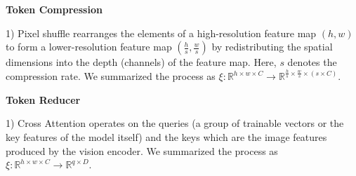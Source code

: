 \noindent \textbf{Token Compression}

1) Pixel shuffle \cite{chen2024far} rearranges the elements of a high-resolution feature map $(h, w)$ to form a lower-resolution feature map $(\frac{h}{s}, \frac{w}{s})$ by redistributing the spatial dimensions into the depth (channels) of the feature map. Here, $s$ denotes the compression rate. 
We summarized the process as $\xi: \mathbb{R}^{h \times w \times C} \xrightarrow{} \mathbb{R}^{\frac{h}{s} \times \frac{w}{s} \times (s\times C)}$.


\noindent \textbf{Token Reducer} 

1) Cross Attention \cite{alayrac2022flamingovisuallanguagemodel,li2023blip2bootstrappinglanguageimagepretraining,chen2024internvlscalingvisionfoundation,dai2023instructblipgeneralpurposevisionlanguagemodels} operates on the queries (a group of trainable vectors or the key features of the model itself) and the keys which are the image features produced by the vision encoder. We summarized the process as $\xi: \mathbb{R}^{h \times w \times C} \xrightarrow{} \mathbb{R}^{q \times D}$. 


